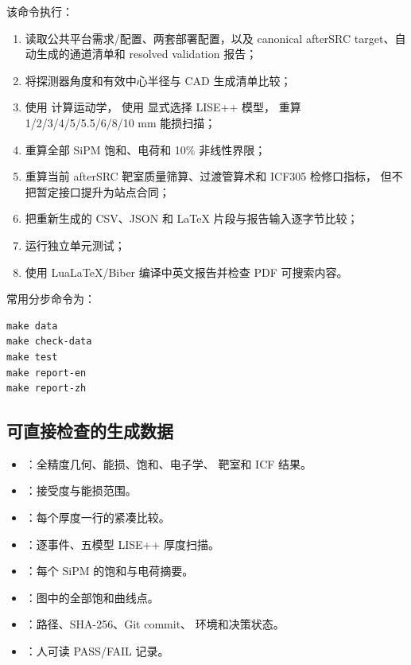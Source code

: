 \documentclass[UTF8,10pt,letterpaper,fontset=none]{ctexart}
\begin{document}
该命令执行：
\begin{enumerate}
  \item 读取公共平台需求/配置、两套部署配置，以及 canonical afterSRC
    target、自动生成的通道清单和 resolved validation 报告；
  \item 将探测器角度和有效中心半径与 CAD 生成清单比较；
  \item 使用  计算运动学，
    使用  显式选择 LISE++ 模型，
    重算 1/2/3/4/5/5.5/6/8/10 mm 能损扫描；
  \item 重算全部 SiPM 饱和、电荷和 10\% 非线性界限；
  \item 重算当前 afterSRC 靶室质量筛算、过渡管算术和 ICF305 检修口指标，
    但不把暂定接口提升为站点合同；
  \item 把重新生成的 CSV、JSON 和 LaTeX 片段与报告输入逐字节比较；
  \item 运行独立单元测试；
  \item 使用 LuaLaTeX/Biber 编译中英文报告并检查 PDF 可搜索内容。
\end{enumerate}

常用分步命令为：
\begin{Verbatim}[fontsize=\small,frame=single]
make data
make check-data
make test
make report-en
make report-zh
\end{Verbatim}

\subsection{可直接检查的生成数据}

\begin{itemize}
  \item {}：全精度几何、能损、饱和、电子学、
    靶室和 ICF 结果。
  \item {}：接受度与能损范围。
  \item {}：每个厚度一行的紧凑比较。
  \item {}：逐事件、五模型 LISE++ 厚度扫描。
  \item {}：每个 SiPM 的饱和与电荷摘要。
  \item {}：图中的全部饱和曲线点。
  \item {}：路径、SHA-256、Git commit、
    环境和决策状态。
  \item {}：人可读 PASS/FAIL 记录。
\end{itemize}
\end{document}

